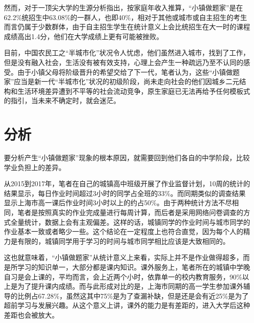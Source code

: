 \documentclass[10pt,a4paper,heading=false]{ctexart}
\begin{document}
    然而，对于一顶尖大学的生源分析指出，按家庭年收入推算，“小镇做题家”是在62.2\%统招生中63.08\%的一群人，也即40\%，相对于其他或城市或自主招生的考生而言仍属于少数群体，由于自主招生学生在统计意义上会比统招生在大一时的课程成绩高出1.4分\cite{pkurev}，他们在大学成绩上更有可能被挫败。

    目前，中国农民工之“半城市化”状况令人忧虑，他们虽然进入城市，找到了工作，但是没有融入社会，生活没有被有效支持，心理上会产生一种疏远乃至不认同的感受。\cite{paracivil}由于小镇父母将阶级晋升的希望交给了下一代，笔者认为，这些“小镇做题家”应当是新一代“半城市化”状况的初级阶段，尚未走向社会的他们因城乡二元结构和生活环境差异遭到不平等的社会流动竞争，原生家庭已无法再给予任何模板式的指引，当未来不确定时，就会迷茫。
    \section{分析}
    要分析产生“小镇做题家”现象的根本原因，就需要回到他们各自的中学阶段，比较学业负担上的差异。

    从2015到2017年，笔者在自己的城镇高中班级开展了作业监督计划，10周的统计的结果显示，每日作业时间超过3小时的同学占全班的33\%\cite{planstormoverview}。而同期类似的调查结果显示上海市高一课后作业时间3小时以上的约占50\%\cite{shanghaihome}。由于两种统计方法不尽相同，笔者是按照真实的作业完成量进行每周计算，而后者是采用网络问卷调查的方式全量统计，数据上会有主观偏差。这样的话，城镇同学的作业时间与城市同学的作业基本一致或者略少一些。这个结论在一定程度上也符合直觉，因为每个人的精力是有限的，城镇同学用于学习的时间与城市同学相比应该是大致相同的。
    
    这也就意味着，“小镇做题家”从统计意义上来看，实际上并不是作业做得超多，而是所学习的知识单一，大部分都是课内知识。课外服务上，笔者所在的城镇中学晚自习是会上课的，平均而言，会上近两个小时，依靠单一的校内教育服务，90\%以上是为了提升课内成绩。而与此形成对比的是，上海市同期的高一学生参加课外辅导的比例占67.28\%，虽然这其中75\%是为了查漏补缺，但是还是会有近25\%是为了超前学习与发展兴趣\cite{shanghaihome}。从这个意义上讲，课外的能力是有差距的，进入大学后这种差距也会被放大。
\end{document}
